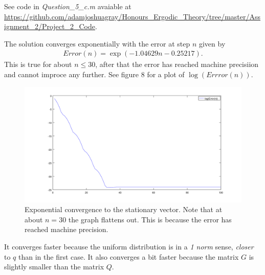 \documentclass{unswmaths}
\begin{document}
\subsubsection{}
See code in \emph{Question\_5\_c.m} avaiable at \url{https://github.com/adamjoshuagray/Honours_Ergodic_Theory/tree/master/Assignment_2/Project_2_Code}. 

The solution converges exponentially with the error at step $ n $ given by
\begin{align*}
    Error(n) = \exp(-1.04629n - 0.25217).
\end{align*}
This is true for about $ n \leq 30 $, after that the error has reached machine precisiion and cannot improce any further. See figure 8 for a plot of $ \log(Errror(n)) $.

\begin{figure}[h]
    \includegraphics[scale=0.5]{Log_Error_n_2}
    \caption{Exponential convergence to the stationary vector. Note that at about $n = 30 $ the graph flattens out. This is because the error has reached machine precision.}
\end{figure}
It converges faster because the uniform distribution is in a \emph{1 norm} sense, \emph{closer} to $ q $ than in the first case. It also converges a bit faster because the matrix $ G $ is slightly smaller than the matrix $ Q $.
\end{document}
